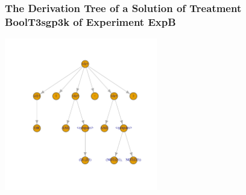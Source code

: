  \begin{frame}
 \frametitle{ The Derivation Tree of a Solution of Treatment BoolT3sgp3k of Experiment ExpB }
 \begin{center}
\includegraphics[width=0.5\textwidth, angle=0]
{ExpBDerivationTreeFigure016.pdf}
 \end{center}
 \label{report/ExpBDerivationTreeFigure016.pdf}  
 \end{frame}

